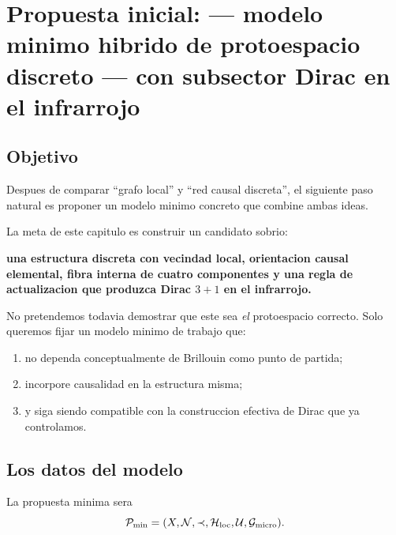 \chapter{Propuesta inicial: --- modelo minimo hibrido de protoespacio discreto --- con subsector Dirac en el infrarrojo}
\label{ch:modelo-minimo-hibrido}







\section{Objetivo}
Despues de comparar \enquote{grafo local} y \enquote{red causal discreta}, el siguiente paso natural es proponer un modelo minimo concreto que combine ambas ideas.

La meta de este capitulo es construir un candidato sobrio:
\begin{displayquote}
\textbf{una estructura discreta con vecindad local, orientacion causal elemental, fibra interna de cuatro componentes y una regla de actualizacion que produzca Dirac \(3+1\) en el infrarrojo.}
\end{displayquote}

No pretendemos todavia demostrar que este sea \emph{el} protoespacio correcto. Solo queremos fijar un modelo minimo de trabajo que:
\begin{enumerate}[label=\arabic*.]
    \item no dependa conceptualmente de Brillouin como punto de partida;
    \item incorpore causalidad en la estructura misma;
    \item y siga siendo compatible con la construccion efectiva de Dirac que ya controlamos.
\end{enumerate}

\section{Los datos del modelo}
La propuesta minima sera
\begin{equation}
\mathcal{P}_{\mathrm{min}}=(X,\mathcal{N},\prec,\mathcal{H}_{\mathrm{loc}},\mathcal{U},\mathcal{G}_{\mathrm{micro}}).
\label{c28:eq:Pmin}
\end{equation}

